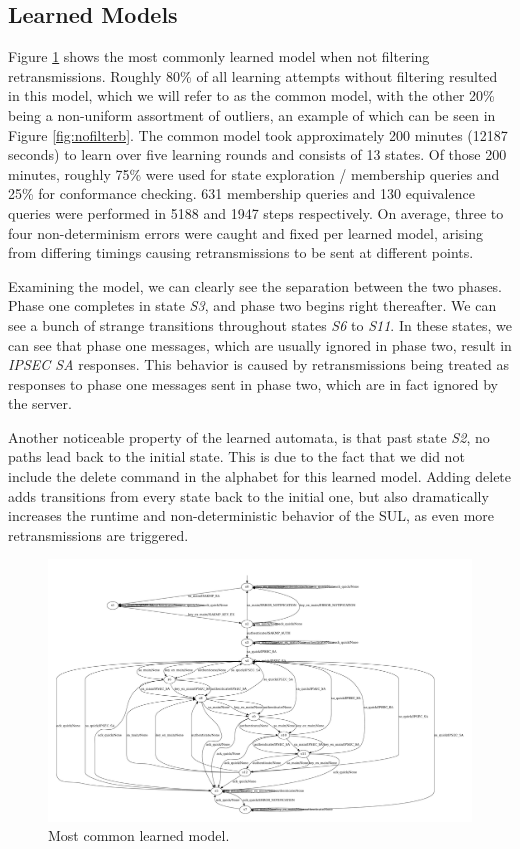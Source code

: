 \subsection{Learned Models} \label{subsec:models}
Figure \ref{fig:nofiltera} shows the most commonly learned model when not filtering retransmissions. Roughly 80\% of all learning attempts without filtering resulted in this model, which we will refer to as the common model, with the other 20\% being a non-uniform assortment of outliers, an example of which can be seen in Figure \ref{fig:nofilterb}. The common model took approximately 200  minutes (12187 seconds) to learn over five learning rounds and consists of 13 states. Of those 200 minutes, roughly 75\% were used for state exploration / membership queries and 25\% for conformance checking. 631 membership queries and 130 equivalence queries were performed in 5188 and 1947 steps respectively. On average, three to four non-determinism errors were caught and fixed per learned model, arising from differing timings causing retransmissions to be sent at different points. 

Examining the model, we can clearly see the separation between the two phases. Phase one completes in state \emph{S3}, and phase two begins right thereafter. We can see a bunch of strange transitions throughout states \emph{S6} to \emph{S11}. In these states, we can see that phase one messages, which are usually ignored in phase two, result in \emph{IPSEC SA} responses. This behavior is caused by retransmissions being treated as responses to phase one messages sent in phase two, which are in fact ignored by the server. 

Another noticeable property of the learned automata, is that past state \emph{S2}, no paths lead back to the initial state. This is due to the fact that we did not include the delete command in the alphabet for this learned model. Adding delete adds transitions from every state back to the initial one, but also dramatically increases the runtime and non-deterministic behavior of the SUL, as even more retransmissions are triggered.

\begin{figure}[h]
	\centering
	\includegraphics[width=\linewidth]{images/NoFilterA}
	\caption{Most common learned model.}
	\label{fig:nofiltera}
\end{figure}


